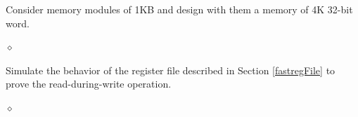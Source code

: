 


\begin{problem}
Consider memory modules of 1KB and design with them a memory of 4K 32-bit word.

$\diamond$
\end{problem}

\begin{problem}
Simulate the behavior of the register file described in Section \ref{fastregFile} to prove the read-during-write operation.

$\diamond$
\end{problem} 